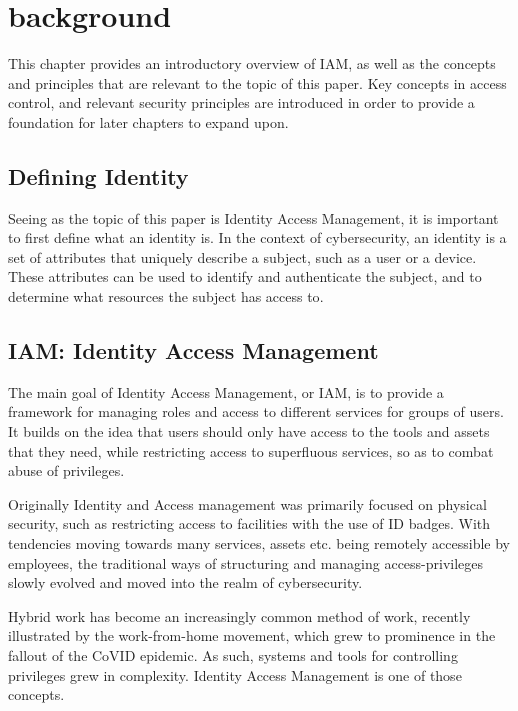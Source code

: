 \section{background}
This chapter provides an introductory overview of IAM, as well as the concepts and principles that are relevant to the topic of this paper. Key concepts in access control, and relevant security principles are introduced in order to provide a foundation for later chapters to expand upon.

\subsection{Defining Identity}
Seeing as the topic of this paper is Identity Access Management, it is important to first define what an identity is. In the context of cybersecurity, an identity is a set of attributes that uniquely describe a subject, such as a user or a device. These attributes can be used to identify and authenticate the subject, and to determine what resources the subject has access to\citep{Gartner-DefIAM}.

\subsection{IAM: Identity Access Management}
The main goal of Identity Access Management, or IAM, is to provide a framework for managing roles and access to different services for groups of users\citep{Gartner-DefIAM}. It builds on the idea that users should only have access to the tools and assets that they need, while restricting access to superfluous services, so as to combat abuse of privileges.

Originally Identity and Access management was primarily focused on physical security, such as restricting access to facilities with the use of ID badges. With tendencies moving towards many services, assets etc. being remotely accessible by employees, the traditional ways of structuring and managing access-privileges slowly evolved and moved into the realm of cybersecurity\citep{StrongDM-IAM}. 

Hybrid work has become an increasingly common method of work, recently illustrated by the work-from-home movement, which grew to prominence in the fallout of the CoVID epidemic. As such, systems and tools for controlling privileges grew in complexity. Identity Access Management is one of those concepts.

